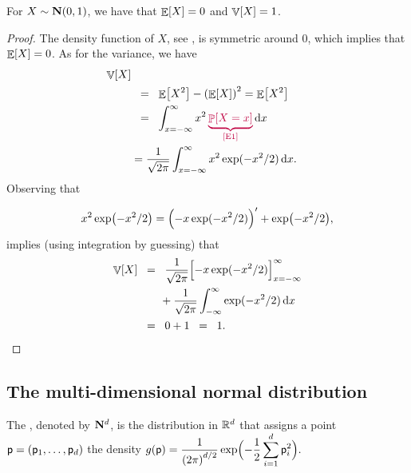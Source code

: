 \begin{lemma}
    For $X \sim \NormalY{0}{1}$, we have that $\mathop{\mathbb{E}}\!\left[ {X} \right] = 0$ and
    $\mathop{\mathbb{V}}\!\left[ {X} \right] = 1$.
\end{lemma}
\begin{proof}
    The density function of $X$, see , is symmetric
    around $0$, which implies that $\mathop{\mathbb{E}}\!\left[ {X} \right] =0$. As for the variance,
    we have
    \begin{align*}
        \Var{X}%
        \\&
        \EQ%
        \Ex{X^2} - \pth{\Ex{X}}^2%
        =%
        \Ex{X^2}%
        \\&
        \EQ%
        \int_{x=-\infty}^\infty x^2 \markX{E1}{\Prob{X =x}}
        \diffX{x}
        \\&
        =
        \frac{1}{\sqrt{2\pi}}\int_{x=-\infty}^\infty x^2\exp(-x^2/2)
        \diffX{x}.        
    \end{align*}
Observing that

    \begin{equation*}
        x^2 \exp\bigl( -x^2/2 \bigr)%
        =%
        \Bigl( - x \exp(-x^2/2)\Bigr)'
        + \exp\bigl(-x^2/2\bigr), 
    \end{equation*}
    implies (using integration by guessing) that
    \begin{align*}
        \Var{X}
        &\EQ%
        \frac{1}{\sqrt{2\pi}}
        \Bigl[ -x \exp(-x^2/2) \Bigr]_{x=-\infty}^{\infty}
        \\&
        \qquad+
        \frac{1}{\sqrt{2\pi}}
        \int_{-\infty}^\infty \exp(-x^2/2) \diffX{x} %
        \\&
        \EQ%
        0+1
        \EQ%
        1.
    \end{align*}
\end{proof}



\subsection{The multi-dimensional normal %
   distribution}

The , denoted by
$\mathbf{N}^{d}$, is the distribution in $\mathbb{R}^d$ that assigns
a point $\mathsf{p} = ( \mathsf{p}_1, \ldots, \mathsf{p}_d)$ the density
    \begin{math}
        \displaystyle g \pth{\pnt}%
        =%
        \frac{1}{\pth{2\pi}^{\hdim/2} } \exp \Bigl( - \frac{1}{2}
        \sum_{i=1}^\hdim \pnt_i^2 \Bigr).
    \end{math}
%

